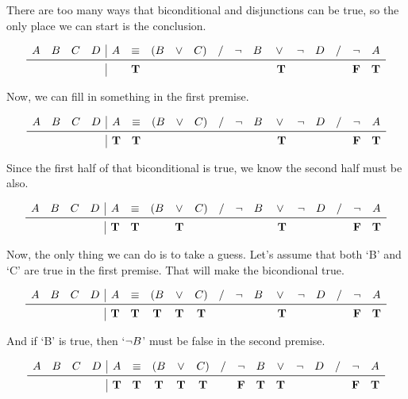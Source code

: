 \documentclass[../logic-text.tex]{subfiles}
\begin{document}
There are too many ways that biconditional and disjunctions can be true, so the only place we can start is the conclusion.

\[
\begin{array}{cccc|cccccccccccccc}
  A&B&C&D& A &  \liff & (B & \lor & C) & / & \lneg & B & \lor & \lneg & D & / & \lneg & A \\ \midrule
  &&&& & \true &&&&&&&\ \true &&&& \false & \true \\
  \end{array}
\]

Now, we can fill in something in the first premise.

\[
\begin{array}{cccc|cccccccccccccc}
  A&B&C&D& A &  \liff & (B & \lor & C) & / & \lneg & B & \lor & \lneg & D & / & \lneg & A \\ \midrule
  &&&& \true & \true &&&&&&&\ \true &&&& \false & \true \\
  \end{array}
\]

Since the first half of that biconditional is true, we know the second half must be also.


\[
\begin{array}{cccc|cccccccccccccc}
  A&B&C&D& A &  \liff & (B & \lor & C) & / & \lneg & B & \lor & \lneg & D & / & \lneg & A \\ \midrule
  &&&& \true & \true && \true &&&&&\ \true &&&& \false & \true \\
  \end{array}
\]

Now, the only thing we can do is to take a guess. Let's assume that both \enquote*{B} and \enquote*{C} are true in the first premise. That will make the bicondional true.

\[
\begin{array}{cccc|cccccccccccccc}
  A&B&C&D& A &  \liff & (B & \lor & C) & / & \lneg & B & \lor & \lneg & D & / & \lneg & A \\ \midrule
  &&&& \true & \true & \true & \true & \true &&&&\ \true &&&& \false & \true \\
  \end{array}
\]

And if \enquote*{B} is true, then \enquote*{\(\neg B\)} must be false in the second premise.

\[
\begin{array}{cccc|cccccccccccccc}
  A&B&C&D& A &  \liff & (B & \lor & C) & / & \lneg & B & \lor & \lneg & D & / & \lneg & A \\ \midrule
  &&&& \true & \true & \true & \true & \true && \false & \true & \true &&&& \false & \true \\
  \end{array}
\]
\end{document}
